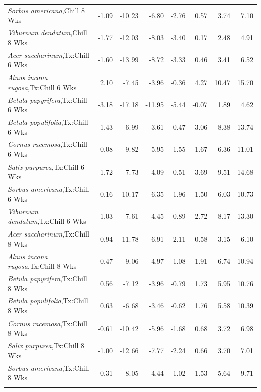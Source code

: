 \documentclass{article}\usepackage[]{graphicx}\usepackage[]{color}
\begin{document}
\begin{longtable}{lrrrrrrr}
  \textit{Sorbus americana},Chill 8 Wks & -1.09 & -10.23 & -6.80 & -2.76 & 0.57 & 3.74 & 7.10 \\ 
  \textit{Viburnum dendatum},Chill 8 Wks & -1.77 & -12.03 & -8.03 & -3.40 & 0.17 & 2.48 & 4.91 \\ 
  \textit{Acer saccharinum},Tx:Chill 6 Wks & -1.60 & -13.99 & -8.72 & -3.33 & 0.46 & 3.41 & 6.52 \\ 
  \textit{Alnus incana rugosa},Tx:Chill 6 Wks & 2.10 & -7.45 & -3.96 & -0.36 & 4.27 & 10.47 & 15.70 \\ 
  \textit{Betula papyrifera},Tx:Chill 6 Wks & -3.18 & -17.18 & -11.95 & -5.44 & -0.07 & 1.89 & 4.62 \\ 
  \textit{Betula populifolia},Tx:Chill 6 Wks & 1.43 & -6.99 & -3.61 & -0.47 & 3.06 & 8.38 & 13.74 \\ 
  \textit{Cornus racemosa},Tx:Chill 6 Wks & 0.08 & -9.82 & -5.95 & -1.55 & 1.67 & 6.36 & 11.01 \\ 
  \textit{Salix purpurea},Tx:Chill 6 Wks & 1.72 & -7.73 & -4.09 & -0.51 & 3.69 & 9.51 & 14.68 \\ 
  \textit{Sorbus americana},Tx:Chill 6 Wks & -0.16 & -10.17 & -6.35 & -1.96 & 1.50 & 6.03 & 10.73 \\ 
  \textit{Viburnum dendatum},Tx:Chill 6 Wks & 1.03 & -7.61 & -4.45 & -0.89 & 2.72 & 8.17 & 13.30 \\ 
  \textit{Acer saccharinum},Tx:Chill 8 Wks & -0.94 & -11.78 & -6.91 & -2.11 & 0.58 & 3.15 & 6.10 \\ 
  \textit{Alnus incana rugosa},Tx:Chill 8 Wks & 0.47 & -9.06 & -4.97 & -1.08 & 1.91 & 6.74 & 10.94 \\ 
  \textit{Betula papyrifera},Tx:Chill 8 Wks & 0.56 & -7.12 & -3.96 & -0.79 & 1.73 & 5.95 & 10.76 \\ 
  \textit{Betula populifolia},Tx:Chill 8 Wks & 0.63 & -6.68 & -3.46 & -0.62 & 1.76 & 5.58 & 10.39 \\ 
  \textit{Cornus racemosa},Tx:Chill 8 Wks & -0.61 & -10.42 & -5.96 & -1.68 & 0.68 & 3.72 & 6.98 \\ 
  \textit{Salix purpurea},Tx:Chill 8 Wks & -1.00 & -12.66 & -7.77 & -2.24 & 0.66 & 3.70 & 7.01 \\ 
  \textit{Sorbus americana},Tx:Chill 8 Wks & 0.31 & -8.05 & -4.44 & -1.02 & 1.53 & 5.64 & 9.71 \\ 
   \hline
\hline
\label{tab:suppmodtotbio}
\end{longtable}
\end{document}
